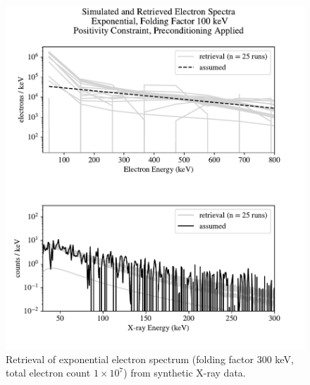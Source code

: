 \begin{figure}[p]
    \centering
    \includegraphics[width=\textwidth]{figures/chapter_4/synthetic_data_examples/exponential_folding_300keV_posonly_preconditioning_1e7_particles}
    \caption{Retrieval of exponential electron spectrum (folding factor 300 keV, total electron count $1\times10^7$) from synthetic X-ray data.}
    \label{why_non_negative_is_good}
\end{figure}

